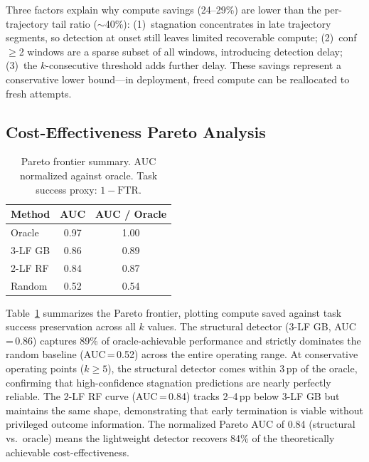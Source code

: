 \documentclass[11pt,a4paper]{article}
\begin{document}
Three factors explain why compute savings (24--29\%) are lower than the per-trajectory tail ratio ($\sim$40\%):
(1)~stagnation concentrates in late trajectory segments, so detection at onset still leaves limited recoverable compute;
(2)~conf$\geq$2 windows are a sparse subset of all windows, introducing detection delay;
(3)~the $k$-consecutive threshold adds further delay.
These savings represent a conservative lower bound---in deployment, freed compute can be reallocated to fresh attempts.

\subsection{Cost-Effectiveness Pareto Analysis}
\label{sec:pareto}

\begin{table}[t]
\centering
\caption{Pareto frontier summary. AUC normalized against oracle. Task success proxy: $1 - \text{FTR}$.}
\label{tab:pareto}
\begin{tabular}{lcc}
\toprule
\textbf{Method} & \textbf{AUC} & \textbf{AUC / Oracle} \\
\midrule
Oracle & 0.97 & 1.00 \\
3-LF GB & 0.86 & 0.89 \\
2-LF RF & 0.84 & 0.87 \\
Random & 0.52 & 0.54 \\
\bottomrule
\end{tabular}
\end{table}

Table~\ref{tab:pareto} summarizes the Pareto frontier, plotting compute saved against task success preservation across all $k$ values.
The structural detector (3-LF GB, AUC\,=\,0.86) captures 89\% of oracle-achievable performance and strictly dominates the random baseline (AUC\,=\,0.52) across the entire operating range.
At conservative operating points ($k{\geq}5$), the structural detector comes within 3\,pp of the oracle, confirming that high-confidence stagnation predictions are nearly perfectly reliable.
The 2-LF RF curve (AUC\,=\,0.84) tracks 2--4\,pp below 3-LF GB but maintains the same shape, demonstrating that early termination is viable without privileged outcome information.
The normalized Pareto AUC of 0.84 (structural vs.\ oracle) means the lightweight detector recovers 84\% of the theoretically achievable cost-effectiveness.

\end{document}
